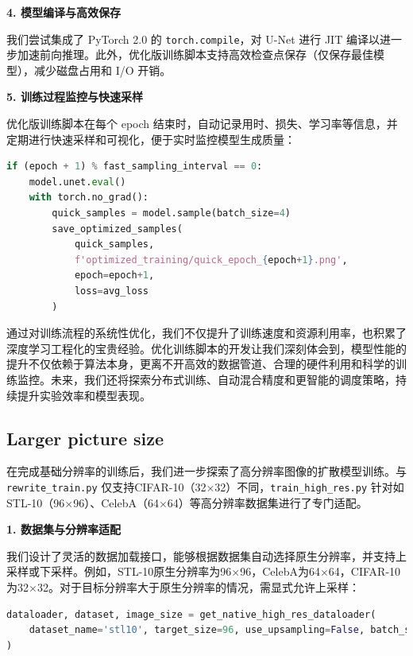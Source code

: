 \documentclass{ctexart}
\begin{document}
\vspace{0.5em}
\noindent
\textbf{4. 模型编译与高效保存}

\noindent
我们尝试集成了 PyTorch 2.0 的 \texttt{torch.compile}，对 U-Net 进行 JIT 编译以进一步加速前向推理。此外，优化版训练脚本支持高效检查点保存（仅保存最佳模型），减少磁盘占用和 I/O 开销。

\vspace{0.5em}
\noindent
\textbf{5. 训练过程监控与快速采样}

\noindent
优化版训练脚本在每个 epoch 结束时，自动记录用时、损失、学习率等信息，并定期进行快速采样和可视化，便于实时监控模型生成质量：

\begin{lstlisting}[language=python]
if (epoch + 1) % fast_sampling_interval == 0:
    model.unet.eval()
    with torch.no_grad():
        quick_samples = model.sample(batch_size=4)
        save_optimized_samples(
            quick_samples, 
            f'optimized_training/quick_epoch_{epoch+1}.png',
            epoch=epoch+1,
            loss=avg_loss
        )
\end{lstlisting}

\vspace{0.5em}

\noindent
通过对训练流程的系统性优化，我们不仅提升了训练速度和资源利用率，也积累了深度学习工程化的宝贵经验。优化训练脚本的开发让我们深刻体会到，模型性能的提升不仅依赖于算法本身，更离不开高效的数据管道、合理的硬件利用和科学的训练监控。未来，我们还将探索分布式训练、自动混合精度和更智能的调度策略，持续提升实验效率和模型表现。


\subsection{Larger picture size}
\noindent
在完成基础分辨率的训练后，我们进一步探索了高分辨率图像的扩散模型训练。与 \texttt{rewrite\_train.py} 仅支持CIFAR-10（32$\times$32）不同，\texttt{train\_high\_res.py} 针对如STL-10（96$\times$96）、CelebA（64$\times$64）等高分辨率数据集进行了专门适配。

\vspace{0.5em}
\noindent
\textbf{1. 数据集与分辨率适配}

\noindent
我们设计了灵活的数据加载接口，能够根据数据集自动选择原生分辨率，并支持上采样或下采样。例如，STL-10原生分辨率为96$\times$96，CelebA为64$\times$64，CIFAR-10为32$\times$32。对于目标分辨率大于原生分辨率的情况，需显式允许上采样：

\begin{lstlisting}[language=python]
dataloader, dataset, image_size = get_native_high_res_dataloader(
    dataset_name='stl10', target_size=96, use_upsampling=False, batch_size=16
)
\end{lstlisting}
\end{document}
